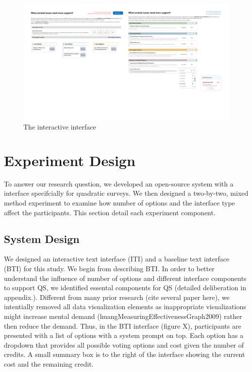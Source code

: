 \begin{figure}[h]
    \centering
    \includegraphics[width=1\textwidth]{content/image/interface.png}
    \caption{The interactive interface}
    \label{fig:interactiveInterface}
\end{figure}

\section{Experiment Design}
To answer our research question, we developed an open-source system with a interface specifcially for quadratic surveys. We then designed a two-by-two, mixed method experiment to examine how number of options and the interface type affect the participants. This section detail each experiment component.

\subsection {System Design}
We designed an interactive text interface (ITI) and a baseline text interface (BTI) for this study. We begin from describing BTI. In order to better understand the influence of number of options and different interface components to support QS, we identified essental components for QS (detailed deliberation in appendix.). Different from many prior research (cite several paper here), we intentially removed all data visualization elements as inappropriate visualizations might increase mental demand (huangMeasuringEffectivenessGraph2009) rather then reduce the demand. Thus, in the BTI interface (figure X), participants are presented with a list of options with a system prompt on top. Each option has a dropdown that provides all possible voting options and cost given the number of credits. A small summary box is to the right of the interface showing the current cost and the remaining credit.

